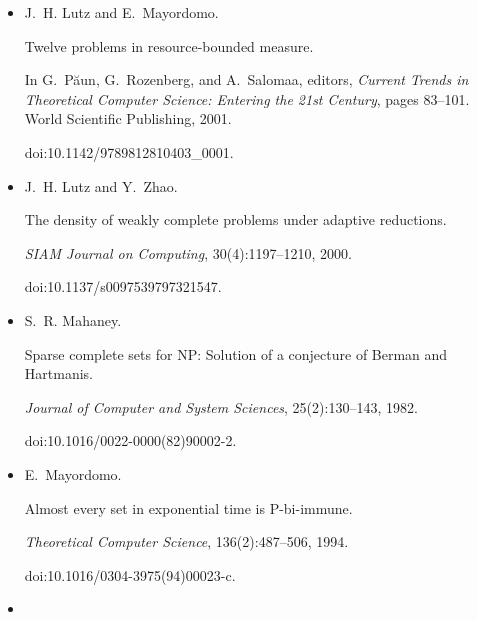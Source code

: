 \begin{itemize}
Measure, stochasticity, and the density of hard languages.


\emph{SIAM Journal on Computing}, 23(4):762–779, 1994.


doi:10.1137/s0097539792237498.





\item[] 
[56]

J. H. Lutz and E. Mayordomo.


Twelve problems in resource-bounded measure.


In G. Păun, G. Rozenberg, and A. Salomaa, editors, \emph{Current
Trends in Theoretical Computer Science: Entering the 21st Century}, pages
83–101. World Scientific Publishing, 2001.


doi:10.1142/9789812810403\_0001.





\item[] 
[57]

J. H. Lutz and Y. Zhao.


The density of weakly complete problems under adaptive reductions.


\emph{SIAM Journal on Computing}, 30(4):1197–1210, 2000.


doi:10.1137/s0097539797321547.





\item[] 
[58]

S. R. Mahaney.


Sparse complete sets for NP: Solution of a conjecture of Berman
and Hartmanis.


\emph{Journal of Computer and System Sciences}, 25(2):130–143, 1982.


doi:10.1016/0022-0000(82)90002-2.





\item[] 
[59]

E. Mayordomo.


Almost every set in exponential time is P-bi-immune.


\emph{Theoretical Computer Science}, 136(2):487–506, 1994.


doi:10.1016/0304-3975(94)00023-c.





\item[] 
[60]


\end{itemize}
